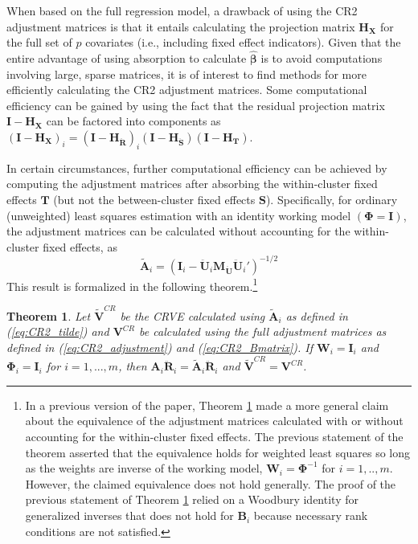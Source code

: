 \documentclass[12pt]{article}
\newtheorem{thm}{Theorem}
\begin{document}
When based on the full regression model, a drawback of using the CR2
adjustment matrices is that it entails calculating the projection matrix
\(\mathbf{H_X}\) for the full set of \(p\) covariates (i.e., including
fixed effect indicators). Given that the entire advantage of using
absorption to calculate \(\hat{\boldsymbol\beta}\) is to avoid
computations involving large, sparse matrices, it is of interest to find
methods for more efficiently calculating the CR2 adjustment matrices.
Some computational efficiency can be gained by using the fact that the
residual projection matrix \(\mathbf{I} - \mathbf{H_X}\) can be factored
into components as
\(\left(\mathbf{I} - \mathbf{H_X}\right)_i = \left(\mathbf{I} - \mathbf{H_{\ddot{R}}}\right)_i \left(\mathbf{I} - \mathbf{H_{\ddot{S}}}\right) \left(\mathbf{I} - \mathbf{H_T}\right)\).

In certain circumstances, further computational efficiency can be
achieved by computing the adjustment matrices after absorbing the
within-cluster fixed effects \(\mathbf{T}\) (but not the between-cluster
fixed effects \(\mathbf{S}\)). Specifically, for ordinary (unweighted)
least squares estimation with an identity working model
\((\boldsymbol\Phi = \mathbf{I})\), the adjustment matrices can be
calculated without accounting for the within-cluster fixed effects, as
\begin{equation}
\label{eq:CR2_tilde}
\mathbf{\tilde{A}}_i = \left(\mathbf{I}_i - \mathbf{\ddot{U}}_i\mathbf{M}_{\mathbf{\ddot{U}}} \mathbf{\ddot{U}}_i'\right)^{-1/2}
\end{equation} This result is formalized in the following
theorem.\footnote{In a previous version of the paper, Theorem
  \ref{thm:absorb} made a more general claim about the equivalence of
  the adjustment matrices calculated with or without accounting for the
  within-cluster fixed effects. The previous statement of the theorem
  asserted that the equivalence holds for weighted least squares so long
  as the weights are inverse of the working model,
  \(\mathbf{W}_i = \boldsymbol\Phi^{-1}\) for \(i = 1,..,m\). However,
  the claimed equivalence does not hold generally. The proof of the
  previous statement of Theorem \ref{thm:absorb} relied on a Woodbury
  identity for generalized inverses that does not hold for
  \(\mathbf{B}_i\) because necessary rank conditions are not satisfied.}

\begin{thm}
\label{thm:absorb}
Let $\mathbf{\tilde{V}}^{CR}$ be the CRVE calculated using $\mathbf{\tilde{A}}_i$ as defined in (\ref{eq:CR2_tilde}) and $\mathbf{V}^{CR}$ be calculated using the full adjustment matrices as defined in (\ref{eq:CR2_adjustment}) and (\ref{eq:CR2_Bmatrix}).
If $\mathbf{W}_i = \mathbf{I}_i$ and $\boldsymbol\Phi_i = \mathbf{I}_i$ for $i = 1,...,m$, then $\mathbf{A}_i \mathbf{\ddot{R}}_i = \mathbf{\tilde{A}}_i \mathbf{\ddot{R}}_i$ and $\mathbf{\tilde{V}}^{CR} = \mathbf{V}^{CR}$.
\end{thm}
\end{document}
